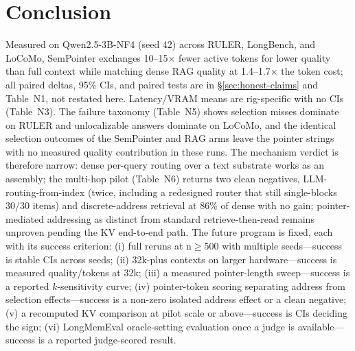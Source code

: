 \section{Conclusion}
\label{sec:conclusion}

Measured on Qwen2.5-3B-NF4 (seed 42) across RULER, LongBench, and LoCoMo, SemPointer exchanges 10--15$\times$ fewer active tokens for lower quality than full context while matching dense RAG quality at 1.4--1.7$\times$ the token cost; all paired deltas, 95\% CIs, and paired tests are in \S\ref{sec:honest-claims} and Table~N1, not restated here. Latency/VRAM means are rig-specific with no CIs (Table~N3).
The failure taxonomy (Table~N5) shows selection misses dominate on RULER and unlocalizable answers dominate on LoCoMo, and the identical selection outcomes of the SemPointer and RAG arms leave the pointer strings with no measured quality contribution in these runs.
The mechanism verdict is therefore narrow: dense per-query routing over a text substrate works as an assembly; the multi-hop pilot (Table~N6) returns two clean negatives, LLM-routing-from-index (twice, including a redesigned router that still single-blocks 30/30 items) and discrete-address retrieval at 86\% of dense with no gain; pointer-mediated addressing as distinct from standard retrieve-then-read remains unproven pending the KV end-to-end path.
The future program is fixed, each with its success criterion:
(i) full reruns at n$\geq$500 with multiple seeds---success is stable CIs across seeds;
(ii) 32k-plus contexts on larger hardware---success is measured quality/tokens at 32k;
(iii) a measured pointer-length sweep---success is a reported $k$-sensitivity curve;
(iv) pointer-token scoring separating address from selection effects---success is a non-zero isolated address effect or a clean negative;
(v) a recomputed KV comparison at pilot scale or above---success is CIs deciding the sign;
(vi) LongMemEval oracle-setting evaluation once a judge is available---success is a reported judge-scored result.
